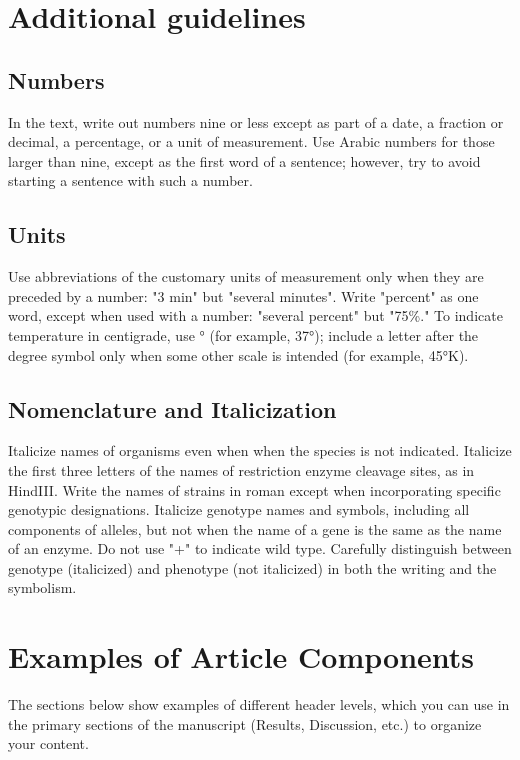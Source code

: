 \documentclass[9pt,twocolumn,twoside]{gsajnl}
\begin{document}
\section*{Additional guidelines}

\subsection*{Numbers} In the text, write out numbers nine or less except as part of a date, a fraction or decimal, a percentage, or a unit of measurement. Use Arabic numbers for those larger than nine, except as the first word of a sentence; however, try to avoid starting a sentence with such a number.

\subsection*{Units} Use abbreviations of the customary units of measurement only when they are preceded by a number: "3 min" but "several minutes". Write "percent" as one word, except when used with a number: "several percent" but "75\%." To indicate temperature in centigrade, use ° (for example, 37°); include a letter after the degree symbol only when some other scale is intended (for example, 45°K).

\subsection*{Nomenclature and Italicization} Italicize names of organisms even when  when the species is not indicated.  Italicize the first three letters of the names of restriction enzyme cleavage sites, as in HindIII. Write the names of strains in roman except when incorporating specific genotypic designations. Italicize genotype names and symbols, including all components of alleles, but not when the name of a gene is the same as the name of an enzyme. Do not use "+" to indicate wild type. Carefully distinguish between genotype (italicized) and phenotype (not italicized) in both the writing and the symbolism.

\section*{Examples of Article Components}
\label{sec:examples}

The sections below show examples of different header levels, which you can use in the primary sections of the manuscript (Results, Discussion, etc.) to organize your content.
\end{document}
